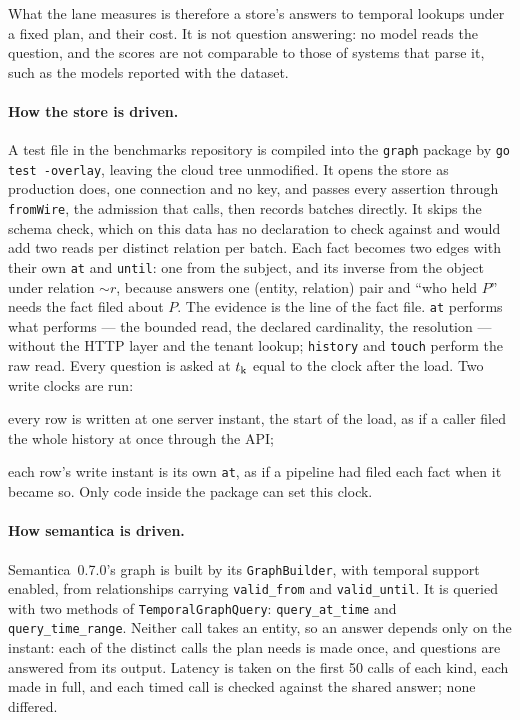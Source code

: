 What the lane measures is therefore a store's answers to temporal lookups under a
fixed plan, and their cost. It is not question answering: no model reads the
question, and the scores are not comparable to those of systems that parse it,
such as the models reported with the dataset.

\paragraph{How the store is driven.}
A test file in the benchmarks repository is compiled into the \texttt{graph}
package by \texttt{go test -overlay}, leaving the cloud tree unmodified. It opens
the store as production does, one connection and no key, and passes every
assertion through \texttt{fromWire}, the admission that  calls,
then records batches directly. It skips the schema check, which on this data has
no declaration to check against and would add two reads per distinct relation
per batch.
Each fact becomes two edges with their own \texttt{at} and \texttt{until}: one
from the subject, and its inverse from the object under relation $\sim\!r$,
because  answers one (entity, relation) pair and ``who held $P$''
needs the fact filed about $P$. The evidence is the line of the fact file.
\texttt{at} performs what  performs --- the bounded read, the declared
cardinality, the resolution --- without the HTTP layer and the tenant lookup;
\texttt{history} and \texttt{touch} perform the raw read. Every question is asked
at $t_{\mathrm{k}}$ equal to the clock after the load. Two write clocks are run:

\begin{description}[leftmargin=1.4cm,style=nextline,itemsep=2pt]
\item[wire] every row is written at one server instant, the start of the load,
  as if a caller filed the whole history at once through the API;
\item[replay] each row's write instant is its own \texttt{at}, as if a pipeline
  had filed each fact when it became so. Only code inside the package can set
  this clock.
\end{description}

\paragraph{How semantica is driven.}
Semantica~0.7.0's graph is built by its \texttt{GraphBuilder}, with temporal
support enabled, from relationships carrying \texttt{valid\_from} and
\texttt{valid\_until}. It is queried with two methods of
\texttt{TemporalGraphQuery}: \texttt{query\_at\_time} and
\texttt{query\_time\_range}.
Neither call takes an entity, so an answer depends only on the instant: each of
the  distinct calls the plan needs is made once, and
questions are answered from its output. Latency is taken on the first 50 calls
of each kind, each made in full, and each timed call is checked against the
shared answer; none differed.

